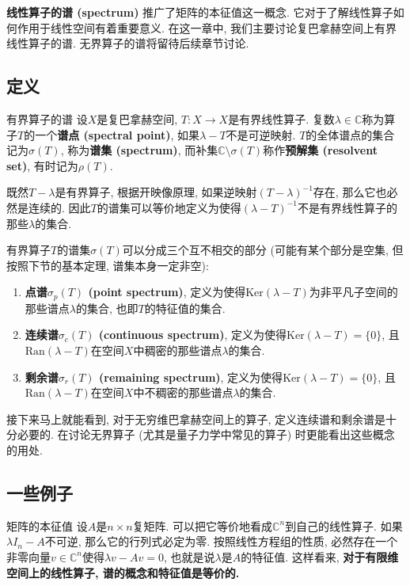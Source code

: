 \textbf{线性算子的谱 (spectrum)} 推广了矩阵的本征值这一概念. 它对于了解线性算子如何作用于线性空间有着重要意义. 在这一章中, 我们主要讨论复巴拿赫空间上有界线性算子的谱. 无界算子的谱将留待后续章节讨论.

\subsection{定义}
\begin{definition}{有界算子的谱}
设$X$是复巴拿赫空间, $T:X\to X$是有界线性算子. 复数$\lambda\in\mathbb{C}$称为算子$T$的一个\textbf{谱点 (spectral point)}, 如果$\lambda-T$不是可逆映射. $T$的全体谱点的集合记为$\sigma(T)$, 称为\textbf{谱集 (spectrum)}, 而补集$\mathbb{C}\setminus\sigma(T)$称作\textbf{预解集 (resolvent set)}, 有时记为$\rho(T)$.
\end{definition}

既然$T-\lambda$是有界算子, 根据开映像原理, 如果逆映射$(T-\lambda)^{-1}$存在, 那么它也必然是连续的. 因此$T$的谱集可以等价地定义为使得$(\lambda-T)^{-1}$不是有界线性算子的那些$\lambda$的集合.

有界算子$T$的谱集$\sigma(T)$可以分成三个互不相交的部分 (可能有某个部分是空集, 但按照下节的基本定理, 谱集本身一定非空):

\begin{enumerate}
\item \textbf{点谱$\sigma_p(T)$ (point spectrum)}, 定义为使得$\text{Ker}(\lambda-T)$为非平凡子空间的那些谱点$\lambda$的集合, 也即$T$的特征值的集合.

\item \textbf{连续谱$\sigma_c(T)$ (continuous spectrum)}, 定义为使得$\text{Ker}(\lambda-T)=\{0\}$, 且$\text{Ran}(\lambda-T)$在空间$X$中稠密的那些谱点$\lambda$的集合.

\item \textbf{剩余谱$\sigma_r(T)$ (remaining spectrum)}, 定义为使得$\text{Ker}(\lambda-T)=\{0\}$, 且$\text{Ran}(\lambda-T)$在空间$X$中不稠密的那些谱点$\lambda$的集合.
\end{enumerate}

接下来马上就能看到, 对于无穷维巴拿赫空间上的算子, 定义连续谱和剩余谱是十分必要的. 在讨论无界算子 (尤其是量子力学中常见的算子) 时更能看出这些概念的用处.

\subsection{一些例子}
\begin{example}{矩阵的本征值}
设$A$是$n\times n$复矩阵. 可以把它等价地看成$\mathbb{C}^n$到自己的线性算子. 如果$\lambda I_n-A$不可逆, 那么它的行列式必定为零. 按照线性方程组的性质, 必然存在一个非零向量$v\in \mathbb{C}^n$使得$\lambda v-Av=0$, 也就是说$\lambda$是$A$的特征值. 这样看来, \textbf{对于有限维空间上的线性算子, 谱的概念和特征值是等价的.}
\end{example}

